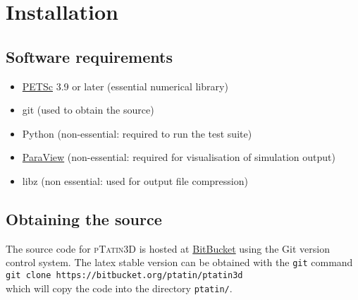 \documentclass[paper=a4, fontsize=10pt,twoside]{scrartcl}
\newcommand{\ptat}{{{\textsc{pTatin3D}}}}
\newcommand{\shellcmd}[1]{\\\indent\indent\texttt{\hspace{5mm}\footnotesize #1}\\}
\newcommand{\unix}[1]{\texttt{\footnotesize #1}}
\begin{document}
\section{Installation}
\subsection{Software requirements}
\begin{itemize}
  \item \href{http://www.mcs.anl.gov/petsc}{PETSc} 3.9 or later (essential numerical library)
	\item git (used to obtain the source)
	\item Python (non-essential: required to run the test suite)
	\item \href{www.paraview.org}{ParaView} (non-essential: required for visualisation of simulation output)
	\item libz (non essential: used for output file compression)
\end{itemize}

\subsection{Obtaining the source}
The source code for {\ptat} is hosted at \href{https://bitbucket.org}{BitBucket} using the Git version control system.
The latex stable version can be obtained with the \unix{git} command
\shellcmd{git clone https://bitbucket.org/ptatin/ptatin3d}
which will copy the code into the directory \unix{ptatin/}.
\end{document}
